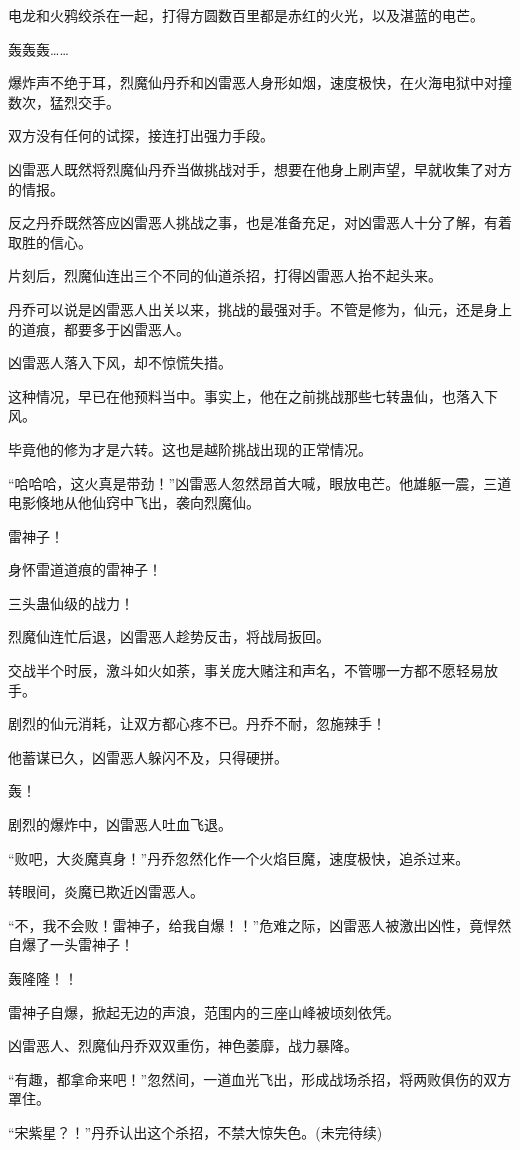 \begin{this_body}
电龙和火鸦绞杀在一起，打得方圆数百里都是赤红的火光，以及湛蓝的电芒。

轰轰轰……

爆炸声不绝于耳，烈魔仙丹乔和凶雷恶人身形如烟，速度极快，在火海电狱中对撞数次，猛烈交手。

双方没有任何的试探，接连打出强力手段。

凶雷恶人既然将烈魔仙丹乔当做挑战对手，想要在他身上刷声望，早就收集了对方的情报。

反之丹乔既然答应凶雷恶人挑战之事，也是准备充足，对凶雷恶人十分了解，有着取胜的信心。

片刻后，烈魔仙连出三个不同的仙道杀招，打得凶雷恶人抬不起头来。

丹乔可以说是凶雷恶人出关以来，挑战的最强对手。不管是修为，仙元，还是身上的道痕，都要多于凶雷恶人。

凶雷恶人落入下风，却不惊慌失措。

这种情况，早已在他预料当中。事实上，他在之前挑战那些七转蛊仙，也落入下风。

毕竟他的修为才是六转。这也是越阶挑战出现的正常情况。

“哈哈哈，这火真是带劲！”凶雷恶人忽然昂首大喊，眼放电芒。他雄躯一震，三道电影倏地从他仙窍中飞出，袭向烈魔仙。

雷神子！

身怀雷道道痕的雷神子！

三头蛊仙级的战力！

烈魔仙连忙后退，凶雷恶人趁势反击，将战局扳回。

交战半个时辰，激斗如火如荼，事关庞大赌注和声名，不管哪一方都不愿轻易放手。

剧烈的仙元消耗，让双方都心疼不已。丹乔不耐，忽施辣手！

他蓄谋已久，凶雷恶人躲闪不及，只得硬拼。

轰！

剧烈的爆炸中，凶雷恶人吐血飞退。

“败吧，大炎魔真身！”丹乔忽然化作一个火焰巨魔，速度极快，追杀过来。

转眼间，炎魔已欺近凶雷恶人。

“不，我不会败！雷神子，给我自爆！！”危难之际，凶雷恶人被激出凶性，竟悍然自爆了一头雷神子！

轰隆隆！！

雷神子自爆，掀起无边的声浪，范围内的三座山峰被顷刻依凭。

凶雷恶人、烈魔仙丹乔双双重伤，神色萎靡，战力暴降。

“有趣，都拿命来吧！”忽然间，一道血光飞出，形成战场杀招，将两败俱伤的双方罩住。

“宋紫星？！”丹乔认出这个杀招，不禁大惊失色。(未完待续)

\end{this_body}

